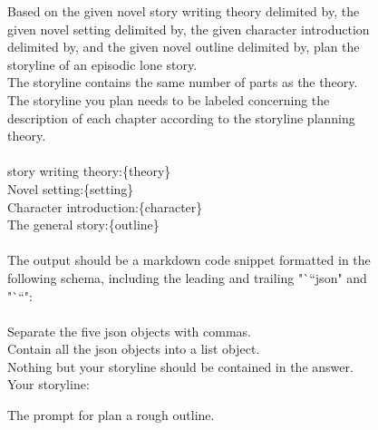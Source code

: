 \begin{figure}[htbp]
\centering
\begin{tcolorbox}
        Based on the given novel story writing theory delimited by, the given novel setting delimited by, the given character introduction delimited by, and the given novel outline delimited by, plan the storyline of an episodic lone story.\\
The storyline contains the same number of parts as the theory.\\
The storyline you plan needs to be labeled concerning the description of each chapter according to the storyline planning theory.\\
\\
story writing theory:\{theory\}\\
Novel setting:\{setting\}\\
Character introduction:\{character\}\\
The general story:\{outline\}\\
\\
The output should be a markdown code snippet formatted in the following schema, including the leading and trailing "```json" and "```":\\
\\
Separate the five json objects with commas.\\
Contain all the json objects into a list object.\\
Nothing but your storyline should be contained in the answer.\\
Your storyline:\\
\end{tcolorbox}
\caption{The prompt for plan a rough outline.}
\label{tab:rough outline prompt}
\end{figure}





